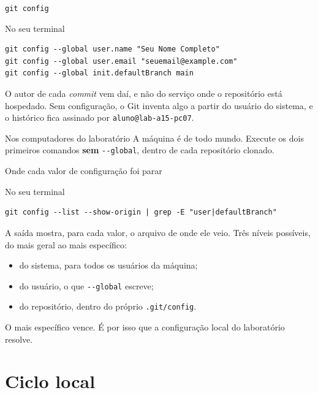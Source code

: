 \documentclass{beamer}
\newcommand{\ddash}{-\mbox{}-}
\newenvironment{noterminal}
  {\begin{exampleblock}{No seu terminal}}
  {\end{exampleblock}}
\begin{document}
\begin{frame}[fragile]{\texttt{git config}}
  \begin{noterminal}
    \begin{verbatim}
git config --global user.name "Seu Nome Completo"
git config --global user.email "seuemail@example.com"
git config --global init.defaultBranch main
    \end{verbatim}
  \end{noterminal}

  O autor de cada \textit{commit} vem daí, e não do serviço onde o repositório
  está hospedado. Sem configuração, o Git inventa algo a partir do usuário do
  sistema, e o histórico fica assinado por \texttt{aluno@lab-a15-pc07}.

  \vspace{0.3cm}
  \begin{alertblock}{Nos computadores do laboratório}
    A máquina é de todo mundo. Execute os dois primeiros comandos
    \textbf{sem} \texttt{\ddash global}, dentro de cada repositório clonado.
  \end{alertblock}
\end{frame}

\begin{frame}[fragile]{Onde cada valor de configuração foi parar}
  \begin{noterminal}
    \begin{verbatim}
git config --list --show-origin | grep -E "user|defaultBranch"
    \end{verbatim}
  \end{noterminal}

  A saída mostra, para cada valor, o arquivo de onde ele veio. Três níveis
  possíveis, do mais geral ao mais específico:

  \begin{itemize}
    \item do sistema, para todos os usuários da máquina;
    \item do usuário, o que \texttt{\ddash global} escreve;
    \item do repositório, dentro do próprio \texttt{.git/config}.
  \end{itemize}

  \vspace{0.2cm}
  O mais específico vence. É por isso que a configuração local do laboratório
  resolve.
\end{frame}

\section{Ciclo local}
\end{document}
